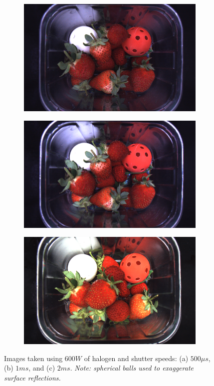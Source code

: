 \documentclass[fleqn,twoside,12pt]{report}
\begin{document}
\begin{figure}[h]
	\centering
	\begin{subfigure}{0.32\textwidth}
		\centering
		\includegraphics[width=\linewidth]{500us.png}
		\caption{}
		\label{fig:500us}
	\end{subfigure}%
	\begin{subfigure}{.32\textwidth}
		\centering
		\includegraphics[width=\linewidth]{1ms.png}
		\caption{}
		\label{fig:1ms}
	\end{subfigure}%
	\begin{subfigure}{.32\textwidth}
		\centering
		\includegraphics[width=\linewidth]{2ms.png}
		\caption{}
		\label{fig:2ms}
	\end{subfigure}%
	\caption{Images taken using $600W$ of halogen and shutter speeds: (a) $500\mu s$, (b) $1ms$, and (c) $2ms$. \textit{Note: spherical balls used to exaggerate surface reflections.}} 
	\label{}
\end{figure} 
\end{document}
